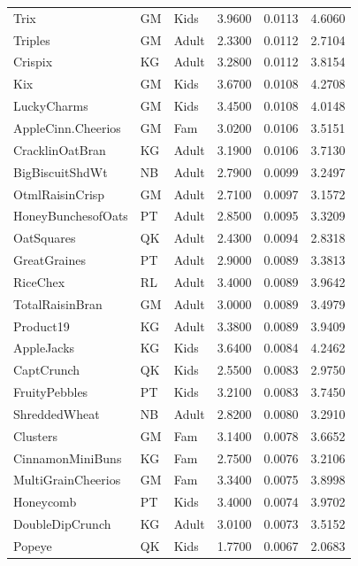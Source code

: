 \begin{table}[!htbp]
\begin{tabular}{llllll}
\\
Trix & GM & Kids & 3.9600 & 0.0113 & 4.6060
\\
Triples & GM & Adult & 2.3300 & 0.0112 & 2.7104
\\
Crispix & KG & Adult & 3.2800 & 0.0112 & 3.8154
\\
Kix & GM & Kids & 3.6700 & 0.0108 & 4.2708
\\
LuckyCharms & GM & Kids & 3.4500 & 0.0108 & 4.0148
\\
AppleCinn.Cheerios & GM & Fam & 3.0200 & 0.0106 & 3.5151
\\
CracklinOatBran & KG & Adult & 3.1900 & 0.0106 & 3.7130
\\
BigBiscuitShdWt & NB & Adult & 2.7900 & 0.0099 & 3.2497
\\
OtmlRaisinCrisp & GM & Adult & 2.7100 & 0.0097 & 3.1572
\\
HoneyBunchesofOats & PT & Adult & 2.8500 & 0.0095 & 3.3209
\\
OatSquares & QK & Adult & 2.4300 & 0.0094 & 2.8318
\\
GreatGraines & PT & Adult & 2.9000 & 0.0089 & 3.3813
\\
RiceChex & RL & Adult & 3.4000 & 0.0089 & 3.9642
\\
TotalRaisinBran & GM & Adult & 3.0000 & 0.0089 & 3.4979
\\
Product19 & KG & Adult & 3.3800 & 0.0089 & 3.9409
\\
AppleJacks & KG & Kids & 3.6400 & 0.0084 & 4.2462
\\
CaptCrunch & QK & Kids & 2.5500 & 0.0083 & 2.9750
\\
FruityPebbles & PT & Kids & 3.2100 & 0.0083 & 3.7450
\\
ShreddedWheat & NB & Adult & 2.8200 & 0.0080 & 3.2910
\\
Clusters & GM & Fam & 3.1400 & 0.0078 & 3.6652
\\
CinnamonMiniBuns & KG & Fam & 2.7500 & 0.0076 & 3.2106
\\
MultiGrainCheerios & GM & Fam & 3.3400 & 0.0075 & 3.8998
\\
Honeycomb & PT & Kids & 3.4000 & 0.0074 & 3.9702
\\
DoubleDipCrunch & KG & Adult & 3.0100 & 0.0073 & 3.5152
\\
Popeye & QK & Kids & 1.7700 & 0.0067 & 2.0683
\\
\hline
\end{tabular}
\end{table}
